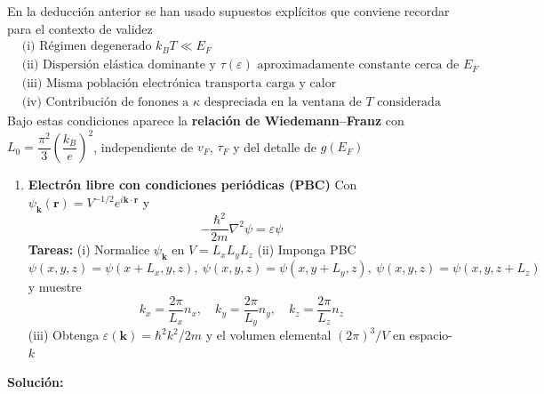 \documentclass{article}
\newenvironment{AGbox}[1][7]%
{%
  \begin{tcolorbox}[
    enhanced, breakable,
    colframe=AppleGreen,
    colback=AppleGreen!#1,
    boxrule=1pt,
    borderline west={2mm}{-10mm}{AppleGreen},
    sharp corners=southwest,
    left=14pt,right=14pt,top=10pt,bottom=10pt,
     boxsep=6pt,
  ]%
}{%
  \end{tcolorbox}%
}
\begin{document}
En la deducción anterior se han usado supuestos explícitos que conviene recordar para el contexto de validez
\begin{equation}\label{eq:hipotesis}
\begin{aligned}
&\text{(i) Régimen degenerado }k_B T \ll E_F\\
&\text{(ii) Dispersión elástica dominante y } \tau(\varepsilon) \text{ aproximadamente constante cerca de } E_F\\
&\text{(iii) Misma población electrónica transporta carga y calor}\\
&\text{(iv) Contribución de fonones a }\kappa\text{ despreciada en la ventana de }T\text{ considerada}
\end{aligned}
\end{equation}
Bajo estas condiciones aparece la \textcolor{Cerulean}{\textbf{relación de Wiedemann–Franz}} con $L_0=\dfrac{\pi^{2}}{3}\left(\dfrac{k_B}{e}\right)^{2}$, independiente de $v_F$, $\tau_F$ y del detalle de $g(E_F)$



\begin{AGbox}[8]
\begin{enumerate}[label={{\textcolor{trueblue}{\textbf{Pr.} \arabic*.4}}}, start=4]
  \item \textcolor{Cerulean}{\textbf{Electrón libre con condiciones periódicas (PBC)}}
  Con $\psi_{\mathbf k}(\mathbf r)=V^{-1/2}e^{i\mathbf k\cdot\mathbf r}$ y
  \begin{equation}\label{eq:Sch-free}
    -\frac{\hbar^2}{2m}\nabla^2\psi=\varepsilon\psi
  \end{equation}
  \textbf{Tareas:}
  (i) Normalice $\psi_{\mathbf k}$ en $V=L_xL_yL_z$
  (ii) Imponga PBC
  \begin{equation}\label{eq:PBC}
    \psi(x,y,z)=\psi(x+L_x,y,z),\ \psi(x,y,z)=\psi(x,y+L_y,z),\ \psi(x,y,z)=\psi(x,y,z+L_z)
  \end{equation}
  y muestre
  \begin{equation}\label{eq:k-grid}
    k_x=\frac{2\pi}{L_x}n_x,\quad k_y=\frac{2\pi}{L_y}n_y,\quad k_z=\frac{2\pi}{L_z}n_z
  \end{equation}
  (iii) Obtenga $\varepsilon(\mathbf k)=\hbar^2k^2/2m$ y el volumen elemental $(2\pi)^3/V$ en espacio-$k$
\end{enumerate}
\end{AGbox}

\vspace{0.5cm}\textcolor{Cinnabar}{\textbf{Solución:}}
\end{document}
